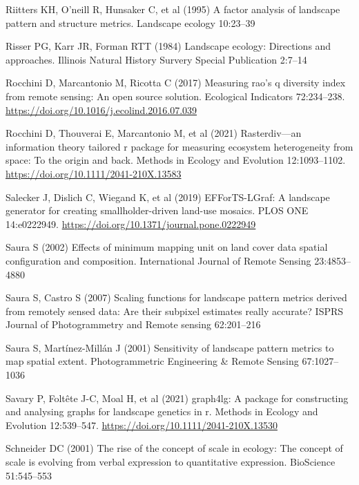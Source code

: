 \documentclass[
  10pt,
  a4paperpaper,
]{article}
\newlength{\cslhangindent}
\newenvironment{CSLReferences}[2] %
 {\begin{list}{}{%
  \setlength{\itemindent}{0pt}
  \setlength{\leftmargin}{0pt}
  \setlength{\parsep}{0pt}
  \ifodd #1
   \setlength{\leftmargin}{\cslhangindent}
   \setlength{\itemindent}{-1\cslhangindent}
  \fi
  \setlength{\itemsep}{#2\baselineskip}}}
 {\end{list}}
\begin{document}
\begin{CSLReferences}{1}{1}
Riitters KH, O'neill R, Hunsaker C, et al (1995) A factor analysis of
landscape pattern and structure metrics. Landscape ecology 10:23--39

Risser PG, Karr JR, Forman RTT (1984) Landscape ecology: Directions and
approaches. Illinois Natural History Survery Special Publication 2:7--14

Rocchini D, Marcantonio M, Ricotta C (2017) Measuring rao's q diversity
index from remote sensing: An open source solution. Ecological
Indicators 72:234--238.
\url{https://doi.org/10.1016/j.ecolind.2016.07.039}

Rocchini D, Thouverai E, Marcantonio M, et al (2021) Rasterdiv---an
information theory tailored r package for measuring ecosystem
heterogeneity from space: To the origin and back. Methods in Ecology and
Evolution 12:1093--1102. \url{https://doi.org/10.1111/2041-210X.13583}

Salecker J, Dislich C, Wiegand K, et al (2019) EFForTS-LGraf: A
landscape generator for creating smallholder-driven land-use mosaics.
PLOS ONE 14:e0222949. \url{https://doi.org/10.1371/journal.pone.0222949}

Saura S (2002) Effects of minimum mapping unit on land cover data
spatial configuration and composition. International Journal of Remote
Sensing 23:4853--4880

Saura S, Castro S (2007) Scaling functions for landscape pattern metrics
derived from remotely sensed data: Are their subpixel estimates really
accurate? ISPRS Journal of Photogrammetry and Remote sensing 62:201--216

Saura S, Martínez-Millán J (2001) Sensitivity of landscape pattern
metrics to map spatial extent. Photogrammetric Engineering \& Remote
Sensing 67:1027--1036

Savary P, Foltête J-C, Moal H, et al (2021) graph4lg: A package for
constructing and analysing graphs for landscape genetics in r. Methods
in Ecology and Evolution 12:539--547.
\url{https://doi.org/10.1111/2041-210X.13530}

Schneider DC (2001) The rise of the concept of scale in ecology: The
concept of scale is evolving from verbal expression to quantitative
expression. BioScience 51:545--553


\end{CSLReferences}
\end{document}
